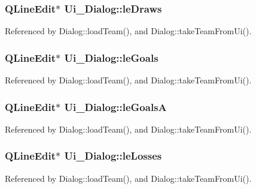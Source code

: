 \subsubsection[{le\+Draws}]{\setlength{\rightskip}{0pt plus 5cm}Q\+Line\+Edit$\ast$ Ui\+\_\+\+Dialog\+::le\+Draws}\label{class_ui___dialog_a884e7aabd14cfbaeb49a967e16dae6cc}


Referenced by Dialog\+::load\+Team(), and Dialog\+::take\+Team\+From\+Ui().

\hypertarget{class_ui___dialog_aa57700d2b5361fec01d869b72711a933}{}
\subsubsection[{le\+Goals}]{\setlength{\rightskip}{0pt plus 5cm}Q\+Line\+Edit$\ast$ Ui\+\_\+\+Dialog\+::le\+Goals}\label{class_ui___dialog_aa57700d2b5361fec01d869b72711a933}


Referenced by Dialog\+::load\+Team(), and Dialog\+::take\+Team\+From\+Ui().

\hypertarget{class_ui___dialog_a0bbec6c46dabbb4ad8a3269780bbe238}{}
\subsubsection[{le\+Goals\+A}]{\setlength{\rightskip}{0pt plus 5cm}Q\+Line\+Edit$\ast$ Ui\+\_\+\+Dialog\+::le\+Goals\+A}\label{class_ui___dialog_a0bbec6c46dabbb4ad8a3269780bbe238}


Referenced by Dialog\+::load\+Team(), and Dialog\+::take\+Team\+From\+Ui().

\hypertarget{class_ui___dialog_a6598d0ce4fee8652cd9a8456de1c0ebe}{}
\subsubsection[{le\+Losses}]{\setlength{\rightskip}{0pt plus 5cm}Q\+Line\+Edit$\ast$ Ui\+\_\+\+Dialog\+::le\+Losses}\label{class_ui___dialog_a6598d0ce4fee8652cd9a8456de1c0ebe}


Referenced by Dialog\+::load\+Team(), and Dialog\+::take\+Team\+From\+Ui().

\hypertarget{class_ui___dialog_a3be40225f286cfb11e01a180ed40e1fc}{}

